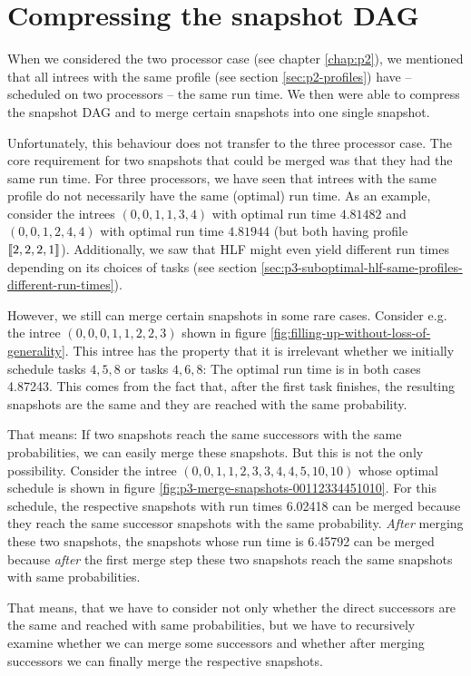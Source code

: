\section{Compressing the snapshot DAG}
\label{sec:p3-compress-snapshots}

When we considered the two processor case (see chapter \ref{chap:p2}), we mentioned that all intrees with the same profile (see section \ref{sec:p2-profiles}) have -- scheduled on two processors -- the same run time. We then were able to compress the snapshot DAG and to merge certain snapshots into one single snapshot.

Unfortunately, this behaviour does not transfer to the three processor case. The core requirement for two snapshots that could be merged was that they had the same run time. For three processors, we have seen that intrees with the same profile do not necessarily have the same (optimal) run time. As an example, consider the intrees $(0,0,1,1,3,4)$ with optimal run time $4.81482$ and $(0,0,1,2,4,4)$ with optimal run time $4.81944$ (but both having profile $\left\llbracket 2,2,2,1 \right\rrbracket$). Additionally, we saw that HLF might even yield different run times depending on its choices of tasks (see section \ref{sec:p3-suboptimal-hlf-same-profiles-different-run-times}).

However, we still can merge certain snapshots in some rare cases. Consider e.g. the intree $(0,0,0,1,1,2,2,3)$ shown in figure \ref{fig:filling-up-without-loss-of-generality}. This intree has the property that it is irrelevant whether we initially schedule tasks $4,5,8$ or tasks $4,6,8$: The optimal run time is in both cases 4.87243. This comes from the fact that, after the first task finishes, the resulting snapshots are the same and they are reached with the same probability.

That means: If two snapshots reach the same successors with the same probabilities, we can easily merge these snapshots. But this is not the only possibility. Consider the intree $(0,0,1,1,2,3,3,4,4,5,10,10)$ whose optimal schedule is shown in figure \ref{fig:p3-merge-snapshots-00112334451010}. For this schedule, the respective snapshots with run times 6.02418 can be merged because they reach the same successor snapshots with the same probability. \emph{After} merging these two snapshots, the snapshots whose run time is 6.45792 can be merged because \emph{after} the first merge step these two snapshots reach the same snapshots with same probabilities. 

That means, that we have to consider not only whether the direct successors are the same and reached with same probabilities, but we have to recursively examine whether we can merge some successors and whether after merging successors we can finally merge the respective snapshots.

